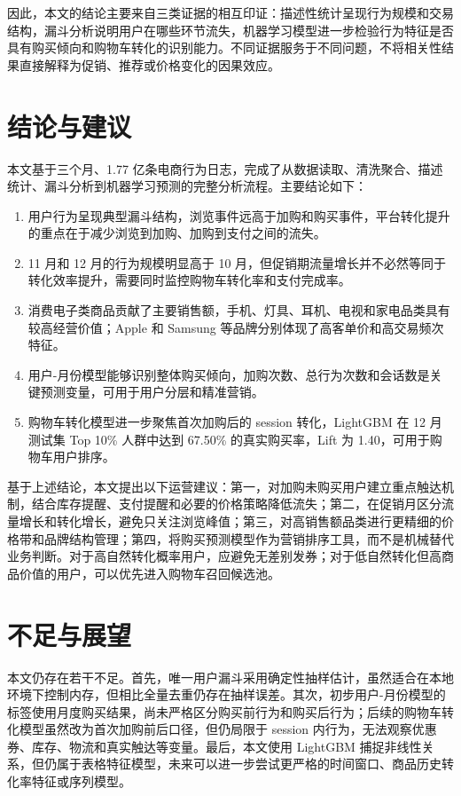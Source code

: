 \documentclass[12pt,hyperref,a4paper,UTF8]{ctexart}
\begin{document}
因此，本文的结论主要来自三类证据的相互印证：描述性统计呈现行为规模和交易结构，漏斗分析说明用户在哪些环节流失，机器学习模型进一步检验行为特征是否具有购买倾向和购物车转化的识别能力。不同证据服务于不同问题，不将相关性结果直接解释为促销、推荐或价格变化的因果效应。

\section{结论与建议}

本文基于三个月、1.77 亿条电商行为日志，完成了从数据读取、清洗聚合、描述统计、漏斗分析到机器学习预测的完整分析流程。主要结论如下：

\begin{enumerate}
  \item 用户行为呈现典型漏斗结构，浏览事件远高于加购和购买事件，平台转化提升的重点在于减少浏览到加购、加购到支付之间的流失。
  \item 11 月和 12 月的行为规模明显高于 10 月，但促销期流量增长并不必然等同于转化效率提升，需要同时监控购物车转化率和支付完成率。
  \item 消费电子类商品贡献了主要销售额，手机、灯具、耳机、电视和家电品类具有较高经营价值；Apple 和 Samsung 等品牌分别体现了高客单价和高交易频次特征。
  \item 用户-月份模型能够识别整体购买倾向，加购次数、总行为次数和会话数是关键预测变量，可用于用户分层和精准营销。
  \item 购物车转化模型进一步聚焦首次加购后的 session 转化，LightGBM 在 12 月测试集 Top 10\% 人群中达到 67.50\% 的真实购买率，Lift 为 1.40，可用于购物车用户排序。
\end{enumerate}

基于上述结论，本文提出以下运营建议：第一，对加购未购买用户建立重点触达机制，结合库存提醒、支付提醒和必要的价格策略降低流失；第二，在促销月区分流量增长和转化增长，避免只关注浏览峰值；第三，对高销售额品类进行更精细的价格带和品牌结构管理；第四，将购买预测模型作为营销排序工具，而不是机械替代业务判断。对于高自然转化概率用户，应避免无差别发券；对于低自然转化但高商品价值的用户，可以优先进入购物车召回候选池。

\section{不足与展望}

本文仍存在若干不足。首先，唯一用户漏斗采用确定性抽样估计，虽然适合在本地环境下控制内存，但相比全量去重仍存在抽样误差。其次，初步用户-月份模型的标签使用月度购买结果，尚未严格区分购买前行为和购买后行为；后续的购物车转化模型虽然改为首次加购前后口径，但仍局限于 session 内行为，无法观察优惠券、库存、物流和真实触达等变量。最后，本文使用 LightGBM 捕捉非线性关系，但仍属于表格特征模型，未来可以进一步尝试更严格的时间窗口、商品历史转化率特征或序列模型。
\end{document}
